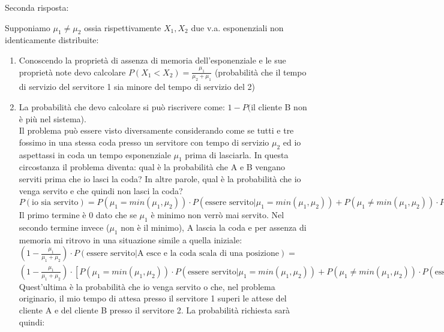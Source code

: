 \documentclass{oxmathproblems}
\begin{document}
\begin{questions}
\miquestion
Seconda risposta:

\begin{solution}
    Supponiamo $\mu_1 \neq \mu_2$ ossia rispettivamente $X_1, X_2$ due v.a. esponenziali non identicamente distribuite:
    \begin{enumerate}[label=(\alph*)]
        \item Conoscendo la proprietà di assenza di memoria dell'esponenziale e le sue proprietà note devo calcolare $P(X_1< X_2) = \frac{\mu_1}{\mu_2 + \mu_1}$ (probabilità che il tempo di servizio del servitore 1 sia minore del tempo di servizio del 2)
        \item La probabilità che devo calcolare si può riscrivere come: $1-P($il cliente B non è più nel sistema).\\
        Il problema può essere visto diversamente considerando come se tutti e tre fossimo in una stessa coda presso un servitore con tempo di servizio $\mu_2$ ed io aspettassi in coda un tempo esponenziale $\mu_1$ prima di lasciarla. In questa circostanza il problema diventa: qual è la probabilità che A e B vengano serviti prima che io lasci la coda? In altre parole, qual è la probabilità che io venga servito e che quindi non lasci la coda?\\
        $P(\text{io sia servito}) = P(\mu_1 = min (\mu_1,\mu_2))\cdot P(\text{essere servito} |\mu_1 = min (\mu_1,\mu_2)) + P(\mu_1 \neq min (\mu_1,\mu_2))\cdot P(\text{essere servito} |\mu_1 \neq min (\mu_1,\mu_2))$\\
        Il primo termine è 0 dato che se $\mu_1$ è minimo non verrò mai servito. Nel secondo termine invece ($\mu_1$ non è il minimo), A lascia la coda e per assenza di memoria mi ritrovo in una situazione simile a quella iniziale:\\
        $(1-\frac{\mu_1}{\mu_1+\mu_2})\cdot P(\text{essere servito} | \text{A esce e la coda scala di una posizione})=$\\
        $(1-\frac{\mu_1}{\mu_1+\mu_2})\cdot [P(\mu_1 = min (\mu_1,\mu_2))\cdot P(\text{essere servito} |\mu_1 = min (\mu_1,\mu_2)) + P(\mu_1 \neq min (\mu_1,\mu_2))\cdot P(\text{essere servito} |\mu_1 \neq min (\mu_1,\mu_2))]=(1-\frac{\mu_1}{\mu_1+\mu_2})\cdot[(1-\frac{\mu_1}{\mu_1+\mu_2})\cdot 1] = (1-\frac{\mu_1}{\mu_1+\mu_2})^2$\\
        Quest'ultima è la probabilità che io venga servito o che, nel problema originario, il mio tempo di attesa presso il servitore 1 superi le attese del cliente A e del cliente B presso il servitore 2. La probabilità richiesta sarà quindi:\\ 

\end{enumerate}
\end{solution}
\end{questions}
\end{document}
